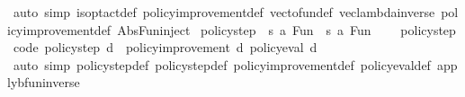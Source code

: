 \begin{isabellebody}
\isamarkupfalse%
\ {\isacharparenleft}{\kern0pt}auto\ simp{\isacharcolon}{\kern0pt}\ is{\isacharunderscore}{\kern0pt}opt{\isacharunderscore}{\kern0pt}act{\isacharunderscore}{\kern0pt}def\ policy{\isacharunderscore}{\kern0pt}improvement{\isacharprime}{\kern0pt}{\isacharunderscore}{\kern0pt}def\ vec{\isacharunderscore}{\kern0pt}to{\isacharunderscore}{\kern0pt}fun{\isacharunderscore}{\kern0pt}def\ vec{\isacharunderscore}{\kern0pt}lambda{\isacharunderscore}{\kern0pt}inverse\ policy{\isacharunderscore}{\kern0pt}improvement{\isacharunderscore}{\kern0pt}def\ Abs{\isacharunderscore}{\kern0pt}Fun{\isacharunderscore}{\kern0pt}inject{\isacharparenright}{\kern0pt}%
\endisatagproof
{\isafoldproof}%
%
\isadelimproof
\isanewline
%
\endisadelimproof
\isanewline
{}\isamarkupfalse%
\ policy{\isacharunderscore}{\kern0pt}step{\isacharprime}{\kern0pt}\ {\isacharcolon}{\kern0pt}{\isacharcolon}{\kern0pt}\ {\isachardoublequoteopen}{\isacharparenleft}{\kern0pt}{\isacharprime}{\kern0pt}s{\isacharcomma}{\kern0pt}\ {\isacharprime}{\kern0pt}a{\isacharparenright}{\kern0pt}\ Fun\ {\isasymRightarrow}\ {\isacharparenleft}{\kern0pt}{\isacharprime}{\kern0pt}s{\isacharcomma}{\kern0pt}\ {\isacharprime}{\kern0pt}a{\isacharparenright}{\kern0pt}\ Fun{\isachardoublequoteclose}\ \isanewline
\ \ \ policy{\isacharunderscore}{\kern0pt}step%
\isadelimproof
%
\endisadelimproof
%
\isatagproof
\isacommand{{\isachardot}{\kern0pt}}\isamarkupfalse%
%
\endisatagproof
{\isafoldproof}%
%
\isadelimproof
%
\endisadelimproof
\isanewline
\isanewline
{}\isamarkupfalse%
\ {\isacharbrackleft}{\kern0pt}code{\isacharbrackright}{\kern0pt}{\isacharcolon}{\kern0pt}\ {\isachardoublequoteopen}policy{\isacharunderscore}{\kern0pt}step{\isacharprime}{\kern0pt}\ d\ {\isacharequal}{\kern0pt}\ policy{\isacharunderscore}{\kern0pt}improvement{\isacharprime}{\kern0pt}\ d\ {\isacharparenleft}{\kern0pt}policy{\isacharunderscore}{\kern0pt}eval{\isacharprime}{\kern0pt}\ d{\isacharparenright}{\kern0pt}{\isachardoublequoteclose}\isanewline
%
\isadelimproof
\ \ %
\endisadelimproof
%
\isatagproof
{}\isamarkupfalse%
\ {\isacharparenleft}{\kern0pt}auto\ simp{\isacharcolon}{\kern0pt}\ policy{\isacharunderscore}{\kern0pt}step{\isacharprime}{\kern0pt}{\isacharunderscore}{\kern0pt}def\ policy{\isacharunderscore}{\kern0pt}step{\isacharunderscore}{\kern0pt}def\ policy{\isacharunderscore}{\kern0pt}improvement{\isacharprime}{\kern0pt}{\isacharunderscore}{\kern0pt}def\ policy{\isacharunderscore}{\kern0pt}eval{\isacharprime}{\kern0pt}{\isacharunderscore}{\kern0pt}def\ apply{\isacharunderscore}{\kern0pt}bfun{\isacharunderscore}{\kern0pt}inverse{\isacharparenright}{\kern0pt}%

\end{isabellebody}
